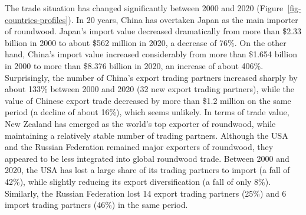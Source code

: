 \documentclass[
  authoryear,
  review,
  3p]{elsarticle}
\begin{document}
The trade situation has changed significantly between 2000 and 2020
(Figure~\ref{fig-countries-profiles}). In 20 years, China has overtaken
Japan as the main importer of roundwood. Japan's import value decreased
dramatically from more than \$2.33 billion in 2000 to about \$562
million in 2020, a decrease of 76\%. On the other hand, China's import
value increased considerably from more than \$1.654 billion in 2000 to
more than \$8.376 billion in 2020, an increase of about 406\%.
Surprisingly, the number of China's export trading partners increased
sharply by about 133\% between 2000 and 2020 (32 new export trading
partners), while the value of Chinese export trade decreased by more
than \$1.2 million on the same period (a decline of about 16\%), which
seems unlikely. In terms of trade value, New Zealand has emerged as the
world's top exporter of roundwood, while maintaining a relatively stable
number of trading partners. Although the USA and the Russian Federation
remained major exporters of roundwood, they appeared to be less
integrated into global roundwood trade. Between 2000 and 2020, the USA
has lost a large share of its trading partners to import (a fall of
42\%), while slightly reducing its export diversification (a fall of
only 8\%). Similarly, the Russian Federation lost 14 export trading
partners (25\%) and 6 import trading partners (46\%) in the same period.
\end{document}
